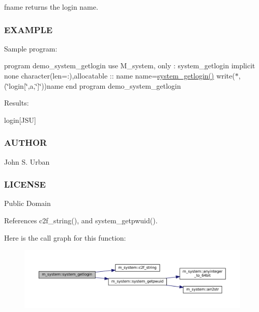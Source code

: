 fname returns the login name.

\subsubsection*{E\+X\+A\+M\+P\+LE}

Sample program\+:

program demo\+\_\+system\+\_\+getlogin use M\+\_\+system, only \+: system\+\_\+getlogin implicit none character(len=\+:),allocatable \+:\+: name name=\mbox{\hyperlink{namespacem__system_a70f78645a1f130734005e190d469529d}{system\+\_\+getlogin()}} write($\ast$,\textquotesingle{}(\char`\"{}login\mbox{[}\char`\"{},a,\char`\"{}\mbox{]}\char`\"{})\textquotesingle{})name end program demo\+\_\+system\+\_\+getlogin

Results\+:

login\mbox{[}J\+SU\mbox{]}

\subsubsection*{A\+U\+T\+H\+OR}

John S. Urban \subsubsection*{L\+I\+C\+E\+N\+SE}

Public Domain 

References c2f\+\_\+string(), and system\+\_\+getpwuid().

Here is the call graph for this function\+:\nopagebreak
\begin{figure}[H]
\begin{center}
\leavevmode
\includegraphics[width=350pt]{namespacem__system_a70f78645a1f130734005e190d469529d_cgraph}
\end{center}
\end{figure}
\mbox{\label{namespacem__system_a59cd13de95dc9a65b444f02614ea39ce}} 
